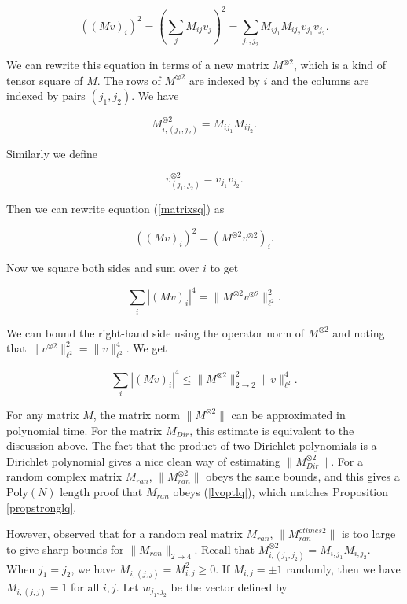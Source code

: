 \documentclass{amsart}
\newcommand{\Poly}{\textrm{Poly}}
\begin{document}
\begin{equation} \label{matrixsq} \left( (Mv)_i \right)^2 = \left( \sum_j M_{ij} v_j \right)^2 = \sum_{j_1, j_2} M_{i j_1} M_{i j_2} v_{j_1} v_{j_2}. 
\end{equation}

We can rewrite this equation in terms of a new matrix $M^{\otimes 2}$,  which is a kind of tensor square of $M$.   The rows of $M^{\otimes 2}$ are indexed by $i$ and the columns are indexed by pairs $(j_1, j_2)$.   We have

$$ M^{\otimes 2}_{i,  (j_1, j_2)} = M_{i j_1} M_{i j_2}. $$

Similarly we define 

$$ v^{\otimes 2}_{(j_1, j_2)} = v_{j_1} v_{j_2}. $$

Then we can rewrite equation (\ref{matrixsq}) as

$$  \left( (Mv)_i \right)^2 = \left( M^{\otimes 2} v^{\otimes 2} \right)_i. $$

Now we square both sides and sum over $i$ to get

$$ \sum_i \left| (Mv)_i \right|^4 = \| M^{\otimes 2} v^{\otimes 2} \|_{\ell^2}^2. $$

We can bound the right-hand side using the operator norm of $M^{\otimes 2}$ and noting that $\| v^{\otimes 2} \|_{\ell^2}^2 = \| v \|_{\ell^2}^4$.  We get

$$ \sum_i \left| (Mv)_i \right|^4 \le  \| M^{\otimes 2} \|_{2 \rightarrow 2}^2  \| v \|_{\ell^2}^4. $$

For any matrix $M$,  the matrix norm $\| M^{\otimes 2} \|$ can be approximated in polynomial time.   For the matrix $M_{Dir}$,  this estimate is equivalent to the discussion above.   The fact that the product of two Dirichlet polynomials is a Dirichlet polynomial gives a nice clean way of estimating $ \| M_{Dir}^{\otimes 2} \|$.   For a random complex matrix $M_{ran}$,  $ \| M_{ran}^{\otimes 2} \|$ obeys the same bounds,  and this gives a $\Poly(N)$ length proof that $M_{ran}$ obeys (\ref{lvoptlq}),  which matches Proposition \ref{propstronglq}.

However,  \cite{BBHKSZ} observed that for a random real matrix $M_{ran}$,  $\| M_{ran}^{otimes 2} \|$ is too large to give sharp bounds for $\| M_{ran} \|_{2 \rightarrow 4}$.   Recall that $M^{\otimes 2}_{i, (j_1, j_2)} = M_{i, j_1} M_{i, j_2}$.    When $j_1 = j_2$,  we have $ M_{i,(j,j)} = M_{i,j}^2 \ge 0$.   If $M_{i,j} = \pm 1$ randomly,  then we have $M_{i, (j,j)} = 1$ for all $i,j$.   Let $w_{j_1, j_2}$ be the vector defined by
\end{document}
